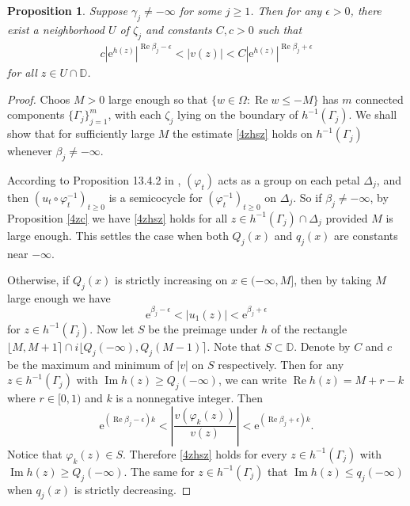 \documentclass{amsart}
\theoremstyle{proclaim}
\newtheorem{proposition}[theorem]{Proposition}
\theoremstyle{fancyproclaim}
\theoremstyle{definition}
\theoremstyle{fancystatement}
\numberwithin{equation}{section}
\begin{document}
\begin{proposition}\label{4zyg}
Suppose $\gamma_j\ne-\infty$ for some $j\geq 1$.  Then for any $\epsilon>0$, there exist a neighborhood $U$ of $\zeta_j$ and constants $C,c>0$ such that
\begin{align}\label{4zhsz}
c\left| \mathrm{e}^{h(z)}\right|^{ \operatorname{Re}\beta_j-\epsilon}<|v(z)|<C\left| \mathrm{e}^{h(z)}\right|^{ \operatorname{Re}\beta_j+\epsilon}
\end{align}
for all $z\in U\cap \mathbb{D}$.
\end{proposition}

\begin{proof}
Choos $M > 0$ large enough so that $\{w \in \Omega :  \operatorname{Re}w\leq -M\}$ has $m$ connected components $\{\Gamma_j\}_{j=1}^m$, with each $\zeta_j$ lying on the boundary of $h^{-1}(\Gamma_j)$. We shall show that for sufficiently large $M$ the estimate \eqref{4zhsz} holds on $h^{-1}(\Gamma_j)$ whenever $\beta_j\ne-\infty$.

According to Proposition 13.4.2 in \cite{cs}, $(\varphi_t)$ acts as a group on each petal $\Delta_j$, and then $(u_t\circ \varphi_t^{-1})_{t\geq0}$ is a semicocycle for $(\varphi_t^{-1})_{t\geq 0}$ on $\Delta_j$. So if $\beta_j\ne-\infty$, by Proposition \ref{4zc} we have \eqref{4zhsz} holds for all $z \in h^{-1}(\Gamma_j) \cap\Delta_j$ provided $M$ is large enough. This settles the case when both $Q_j(x)$ and $q_j(x)$ are constants near $-\infty$.

Otherwise, if $Q_j(x)$ is strictly increasing on $x \in(-\infty, M]$, then by taking $M$ large enough we have
$$\mathrm{e}^{\beta_j-\epsilon}<|u_1(z)|<\mathrm{e}^{\beta_j+\epsilon}$$ 
for $z\in h^{-1}(\Gamma_j)$. Now let $S$ be the preimage under $h$ of the rectangle $\lfloor M,M +1\rceil\cap i\lfloor Q_j(-\infty), Q_j(M -1)\rceil$. Note that $S\subset\mathbb{D}$. Denote by $C$ and $c$ be the maximum and minimum of $|v|$ on $S$ respectively. Then for any $z\in h^{-1}(\Gamma_j)$ with $ \operatorname{Im}h(z)\geq  Q_j(-\infty)$, we can write $\operatorname{Re}h(z) = M +r-k$ where $r \in [0,1)$ and $k$ is a nonnegative integer. Then
$$\mathrm{e}^{( \operatorname{Re}\beta_j-\epsilon)k} <\left|\frac{v(\varphi_k(z))}{v(z)}\right| < \mathrm{e}^{( \operatorname{Re}\beta_j+\epsilon)k}.$$
Notice that $\varphi_k(z)\in S$. Therefore \eqref{4zhsz} holds for every $z \in h^{-1}(\Gamma_j)$ with $ \operatorname{Im}h(z) \geq Q_j(-\infty)$. The same for $z \in h^{-1}(\Gamma_j)$ that $ \operatorname{Im}h(z) \leq q_j(-\infty)$ when $q_j(x)$ is strictly decreasing.
\end{proof}
\end{document}

